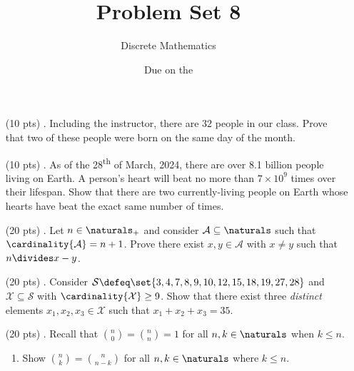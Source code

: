 

\title{Problem Set 8}
\author[Daniel Gonzalez Cedre]{Discrete Mathematics}
\date{Due on the }



\maketitle

\begin{enumerate}
  \item[(10 pts) \quad 1.]
    Including the instructor, there are $32$ people in our class.
    Prove that two of these people were born on the same day of the month.

  \item[(10 pts) \quad 2.]
    As of the 28\textsuperscript{th} of March, 2024, there are over 8.1 billion people living on Earth.%
    A person's heart will beat no more than $7 \times 10^9$ times over their lifespan.
    Show that there are two currently-living people on Earth whose hearts have beat the exact same number of times. 

  \item[(20 pts) \quad 3.]
    Let $n \in \naturals_+$ and consider $\mathcal{A} \subseteq \naturals$ such that $\cardinality{\mathcal{A}} = n + 1$.
    Prove there exist $x, y \in \mathcal{A}$ with $x \neq y$ such that $n \divides x - y$.

  \item[(20 pts) \quad 4.]
    Consider $\mathcal{S} \defeq \set{3, 4, 7, 8, 9, 10, 12, 15, 18, 19, 27, 28}$ and $\mathcal{X} \subseteq \mathcal{S}$ with $\cardinality{\mathcal{X}} \geq 9$.
    Show that there exist three \emph{distinct} elements $x_1, x_2, x_3 \in \mathcal{X}$ such that $x_1 + x_2 + x_3 = 35$.

  \item[(20 pts) \quad 5.]
    Recall that $\binom{n}{0} = \binom{n}{n} = 1$ for all $n, k \in \naturals$ when $k \leq n$.
    \begin{enumerate}
      \item
        Show $\binom{n}{k} = \binom{n}{n - k}$ for all $n, k \in \naturals$ where $k \leq n$.


\end{enumerate}
\end{enumerate}
